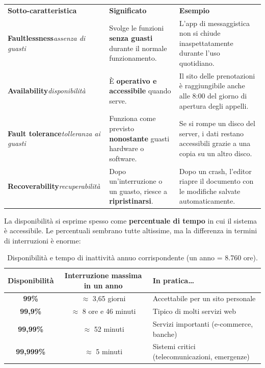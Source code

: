 \begin{table}[H]
\centering
\renewcommand{\arraystretch}{1.4}
\begin{tabularx}{\textwidth}{P{3.6cm} L L}
\textbf{Sotto-caratteristica} & \textbf{Significato} & \textbf{Esempio} \\
\textbf{Faultlessness}\newline\textit{\small assenza di guasti} & Svolge le funzioni \textbf{senza guasti} durante il normale funzionamento. & L'app di messaggistica non si chiude inaspettatamente durante l'uso quotidiano. \\
\textbf{Availability}\newline\textit{\small disponibilità} & È \textbf{operativo e accessibile} quando serve. & Il sito delle prenotazioni è raggiungibile anche alle 8:00 del giorno di apertura degli appelli. \\
\textbf{Fault tolerance}\newline\textit{\small tolleranza ai guasti} & Funziona come previsto \textbf{nonostante} guasti hardware o software. & Se si rompe un disco del server, i dati restano accessibili grazie a una copia su un altro disco. \\
\textbf{Recoverability}\newline\textit{\small recuperabilità} & Dopo un'interruzione o un guasto, riesce a \textbf{ripristinarsi}. & Dopo un crash, l'editor riapre il documento con le modifiche salvate automaticamente. \\
\bottomrule
\end{tabularx}
\end{table}

La disponibilità si esprime spesso come \textbf{percentuale di tempo} in cui il sistema è accessibile. Le percentuali sembrano tutte
altissime, ma la differenza in termini di interruzioni è enorme:

\begin{table}[H]
\centering
\renewcommand{\arraystretch}{1.3}
\begin{tabular}{>{\bfseries}c c l}
\toprule
Disponibilità & Interruzione massima in un anno & In pratica\ldots \\
\midrule
99\%      & $\approx$ 3,65 giorni & Accettabile per un sito personale \\
99,9\%    & $\approx$ 8 ore e 46 minuti & Tipico di molti servizi web \\
99,99\%   & $\approx$ 52 minuti & Servizi importanti (e-commerce, banche) \\
99,999\%  & $\approx$ 5 minuti & Sistemi critici (telecomunicazioni, emergenze) \\
\bottomrule
\end{tabular}
\caption{Disponibilità e tempo di inattività annuo corrispondente (un anno = 8.760 ore).}
\end{table}

